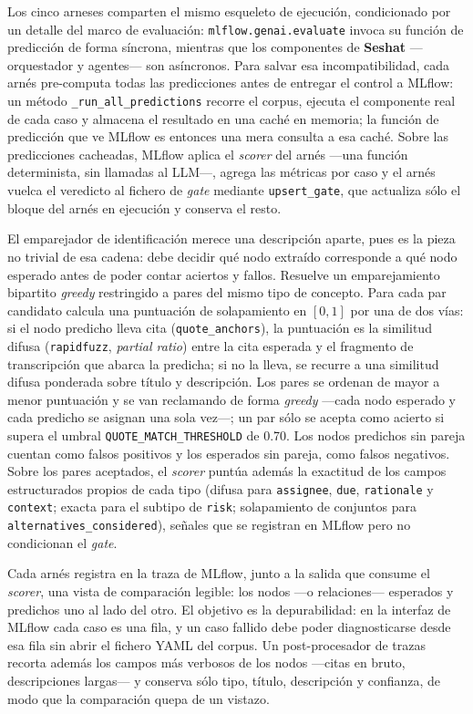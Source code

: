 Los cinco arneses comparten el mismo esqueleto de ejecución, condicionado por un detalle del marco
de evaluación: \texttt{mlflow.genai.evaluate} invoca su función de predicción de forma síncrona,
mientras que los componentes de \textbf{Seshat} —orquestador y agentes— son asíncronos. Para
salvar esa incompatibilidad, cada arnés pre-computa todas las predicciones antes de entregar el
control a MLflow: un método \texttt{\_run\_all\_predictions} recorre el corpus, ejecuta el
componente real de cada caso y almacena el resultado en una caché en memoria; la función de
predicción que ve MLflow es entonces una mera consulta a esa caché. Sobre las predicciones
cacheadas, MLflow aplica el \textit{scorer} del arnés —una función determinista, sin llamadas al
LLM—, agrega las métricas por caso y el arnés vuelca el veredicto al fichero de \textit{gate}
mediante \texttt{upsert\_gate}, que actualiza sólo el bloque del arnés en ejecución y conserva el
resto.

El emparejador de identificación merece una descripción aparte, pues es la pieza no trivial de esa
cadena: debe decidir qué nodo extraído corresponde a qué nodo esperado antes de poder contar
aciertos y fallos. Resuelve un emparejamiento bipartito \textit{greedy} restringido a pares del
mismo tipo de concepto. Para cada par candidato calcula una puntuación de solapamiento en $[0,1]$
por una de dos vías: si el nodo predicho lleva cita (\texttt{quote\_anchors}), la puntuación es la
similitud difusa (\texttt{rapidfuzz}, \textit{partial ratio}) entre la cita esperada y el fragmento
de transcripción que abarca la predicha; si no la lleva, se recurre a una similitud difusa
ponderada sobre título y descripción. Los pares se ordenan de mayor a menor puntuación y se van
reclamando de forma \textit{greedy} —cada nodo esperado y cada predicho se asignan una sola vez—;
un par sólo se acepta como acierto si supera el umbral \texttt{QUOTE\_MATCH\_THRESHOLD} de 0.70. Los
nodos predichos sin pareja cuentan como falsos positivos y los esperados sin pareja, como falsos
negativos. Sobre los pares aceptados, el \textit{scorer} puntúa además la exactitud de los campos
estructurados propios de cada tipo (difusa para \texttt{assignee}, \texttt{due}, \texttt{rationale}
y \texttt{context}; exacta para el subtipo de \texttt{risk}; solapamiento de conjuntos para
\texttt{alternatives\_considered}), señales que se registran en MLflow pero no condicionan el
\textit{gate}.

Cada arnés registra en la traza de MLflow, junto a la salida que consume el \textit{scorer}, una
vista de comparación legible: los nodos —o relaciones— esperados y predichos uno al lado del otro.
El objetivo es la depurabilidad: en la interfaz de MLflow cada caso es una fila, y un caso fallido
debe poder diagnosticarse desde esa fila sin abrir el fichero YAML del corpus. Un
post-procesador de trazas recorta además los campos más verbosos de los nodos —citas en bruto,
descripciones largas— y conserva sólo tipo, título, descripción y confianza, de modo que la
comparación quepa de un vistazo.

